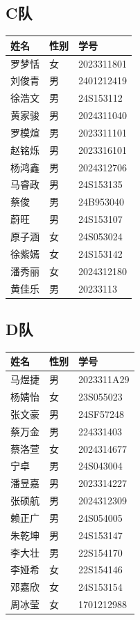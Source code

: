 \documentclass{ctexart}
\begin{document}
\subsection*{C队}
\renewcommand{\arraystretch}{1.2}
\begin{tabularx}{\textwidth}{@{} L{3cm} M{2cm} X @{}}
    \toprule
    \textbf{姓名} & \textbf{性别} & \textbf{学号} \\
    \midrule
    罗梦恬 & 女 & 2023311801 \\
    刘俊青 & 男 & 2401212419 \\
    徐浩文 & 男 & 24S153112 \\
    黄家骏 & 男 & 2024311040 \\
    罗模煊 & 男 & 2023311101 \\
    赵铭烁 & 男 & 2023316101 \\
    杨鸿鑫 & 男 & 2024312706 \\
    马睿政 & 男 & 24S153135 \\
    蔡俊 & 男 & 24B953040 \\
    蔚旺 & 男 & 24S153107 \\
    原子涵 & 女 & 24S053024 \\
    徐紫嫣 & 女 & 24S153142 \\
    潘秀丽 & 女 & 2024312180 \\
    黄佳乐 & 男 & 20233113 \\
    \bottomrule
\end{tabularx}

\subsection*{D队}
\renewcommand{\arraystretch}{1.2}
\begin{tabularx}{\textwidth}{@{} L{3cm} M{2cm} X @{}}
    \toprule
    \textbf{姓名} & \textbf{性别} & \textbf{学号} \\
    \midrule
    马煜捷 & 男 & 2023311A29 \\
    杨婧怡 & 女 & 23S055023 \\
    张文豪 & 男 & 24SF57248 \\
    蔡万金 & 男 & 224331403 \\
    蔡洛萱 & 女 & 2024314677 \\
    宁卓 & 男 & 24S043004 \\
    潘昱嘉 & 男 & 2023314227 \\
    张硕航 & 男 & 2024312309 \\
    赖正广 & 男 & 24S054005 \\
    朱乾坤 & 男 & 24S153147 \\
    李大壮 & 男 & 22S154170 \\
    李娅希 & 女 & 22S154146 \\
    邓嘉欣 & 女 & 24S153154 \\
    周冰莹 & 女 & 1701212988 \\
    \bottomrule
\end{tabularx}
\end{document}
